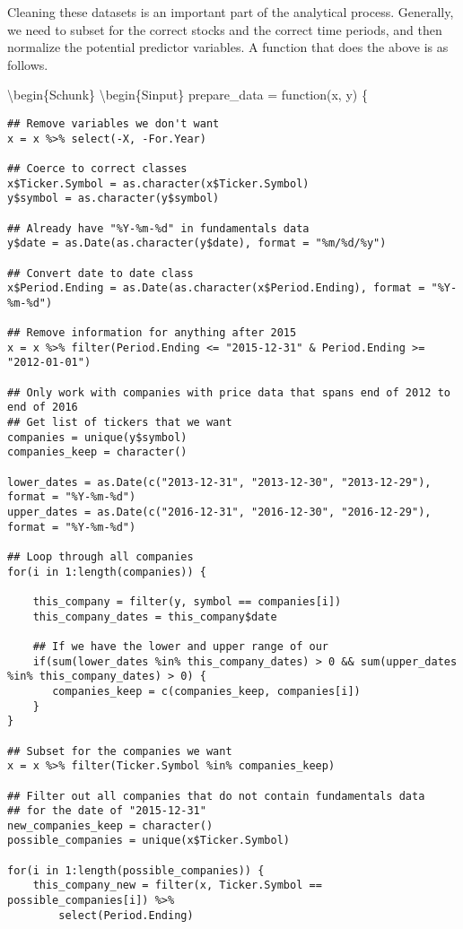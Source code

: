Cleaning these datasets is an important part of the analytical process.
Generally, we need to subset for the correct stocks and the correct time
periods, and then normalize the potential predictor variables. A
function that does the above is as follows.

\textbackslash{}begin\{Schunk\} \textbackslash{}begin\{Sinput\}
prepare\_data = function(x, y) \{

\begin{verbatim}
## Remove variables we don't want 
x = x %>% select(-X, -For.Year)

## Coerce to correct classes
x$Ticker.Symbol = as.character(x$Ticker.Symbol)
y$symbol = as.character(y$symbol)

## Already have "%Y-%m-%d" in fundamentals data 
y$date = as.Date(as.character(y$date), format = "%m/%d/%y")

## Convert date to date class
x$Period.Ending = as.Date(as.character(x$Period.Ending), format = "%Y-%m-%d")

## Remove information for anything after 2015
x = x %>% filter(Period.Ending <= "2015-12-31" & Period.Ending >= "2012-01-01")

## Only work with companies with price data that spans end of 2012 to end of 2016
## Get list of tickers that we want 
companies = unique(y$symbol)
companies_keep = character()

lower_dates = as.Date(c("2013-12-31", "2013-12-30", "2013-12-29"), format = "%Y-%m-%d")
upper_dates = as.Date(c("2016-12-31", "2016-12-30", "2016-12-29"), format = "%Y-%m-%d")

## Loop through all companies 
for(i in 1:length(companies)) {
    
    this_company = filter(y, symbol == companies[i])
    this_company_dates = this_company$date
    
    ## If we have the lower and upper range of our
    if(sum(lower_dates %in% this_company_dates) > 0 && sum(upper_dates %in% this_company_dates) > 0) {
       companies_keep = c(companies_keep, companies[i]) 
    } 
}

## Subset for the companies we want 
x = x %>% filter(Ticker.Symbol %in% companies_keep)

## Filter out all companies that do not contain fundamentals data 
## for the date of "2015-12-31"
new_companies_keep = character()
possible_companies = unique(x$Ticker.Symbol)

for(i in 1:length(possible_companies)) {
    this_company_new = filter(x, Ticker.Symbol == possible_companies[i]) %>% 
        select(Period.Ending)
    

\end{verbatim}
